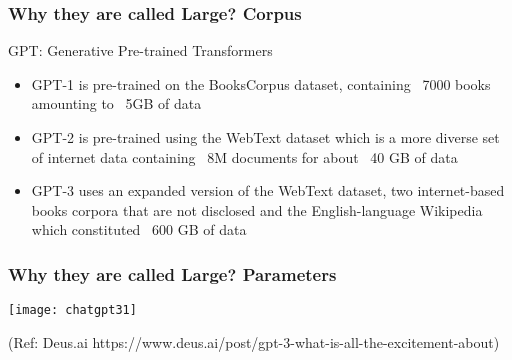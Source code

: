\begin{frame}[fragile]\frametitle{Why they are called Large? Corpus}

GPT: Generative Pre-trained Transformers

\begin{itemize}
\item GPT-1 is pre-trained on the BooksCorpus dataset, containing ~7000 books amounting to ~5GB of data
\item GPT-2 is pre-trained using the WebText dataset which is a more diverse set of internet data containing ~8M documents for about ~40 GB of data
\item GPT-3 uses an expanded version of the WebText dataset, two internet-based books corpora that are not disclosed and the English-language Wikipedia which constituted ~600 GB of data
\end{itemize}	 

\end{frame}

\begin{frame}[fragile]\frametitle{Why they are called Large? Parameters}

\begin{center}
\texttt{[image: chatgpt31]}
\end{center}				
{\tiny (Ref: Deus.ai https://www.deus.ai/post/gpt-3-what-is-all-the-excitement-about)}

\end{frame}




